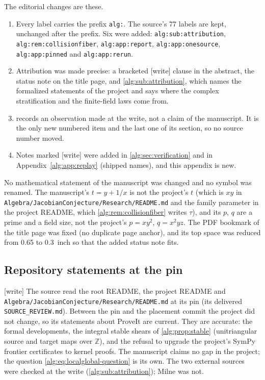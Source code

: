 \documentclass[11pt]{article}
\numberwithin{equation}{section}
\theoremstyle{plain}
\theoremstyle{plain}
\theoremstyle{plain}
\theoremstyle{definition}
\theoremstyle{definition}
\theoremstyle{definition}
\theoremstyle{remark}
\newcommand{\Z}{\mathbb Z}\newcommand{\Q}{\mathbb Q}
\newcommand{\wtag}{\textup{[write]}}%
\newcommand{\rpath}[1]{\nolinkurl{#1}}
\begin{document}
The editorial changes are these.
\begin{enumerate}[label=(\arabic*)]
\item Every label carries the prefix \texttt{alg:}. The source's 77 labels
are kept, unchanged after the prefix. Six were added:
\texttt{alg:sub:attribution}, \texttt{alg:rem:collisionfiber},
\texttt{alg:app:report}, \texttt{alg:app:onesource},
\texttt{alg:app:pinned} and \texttt{alg:app:rerun}.
\item Attribution was made precise: a bracketed \wtag{} clause in the
abstract, the status note on the title page, and
\cref{alg:sub:attribution}, which names the formalized statements of the
project and says where the complex stratification and the finite-field
laws come from.
\item {} records an observation made at the
write, not a claim of the manuscript. It is the only new numbered item and
the last one of its section, so no source number moved.
\item Notes marked \wtag{} were added in \cref{alg:sec:verification} and
in Appendix~\ref{alg:app:replay} (shipped names), and this appendix is
new.
\end{enumerate}
No mathematical statement of the manuscript was changed and no symbol was
renamed. The manuscript's $t=y+1/x$ is not the project's $t$ (which is
$xy$ in \rpath{Algebra/JacobianConjecture/Research/README.md} and the
family parameter in the project README, which
\cref{alg:rem:collisionfiber} writes $\tau$), and its $p$, $q$ are a prime and a
field size, not the project's $p=xy^2$, $q=x^2yz$. The PDF bookmark of the
title page was fixed (no duplicate page anchor), and its top space was
reduced from 0.65 to 0.3~inch so that the added status note fits.

\subsection{Repository statements at the pin}\label{alg:app:pinned}
\wtag{} The source read the root README, the project README and
\rpath{Algebra/JacobianConjecture/Research/README.md} at its pin (its
delivered \rpath{SOURCE_REVIEW.md}). Between the pin and the placement
commit the project did not change, so its statements about ProveIt are
current. They are accurate: the formal developments, the integral stable
shears of \cref{alg:prop:stable} (unitriangular source and target maps
over $\Z$), and the refusal to upgrade the project's SymPy frontier
certificates to kernel proofs. The manuscript claims no gap in the
project; the question \eqref{alg:eq:localglobal-question} is its own. The
two external sources were checked at the write
(\cref{alg:sub:attribution}); Milne was not.
\end{document}
